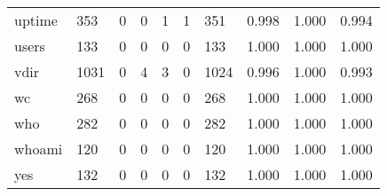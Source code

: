 \begin{longtable}{lp{1.3cm}p{1.3cm}p{1.3cm}p{1.3cm}p{1.3cm}p{1.3cm}p{1.3cm}p{1.3cm}p{1.3cm}}
uptime    &                    353 &                                  0 &                                 0 &                                1 &                                 1 &                             351 &                                   0.998 &                                  1.000 &                                0.994 \\
users     &                    133 &                                  0 &                                 0 &                                0 &                                 0 &                             133 &                                   1.000 &                                  1.000 &                                1.000 \\
vdir      &                   1031 &                                  0 &                                 4 &                                3 &                                 0 &                            1024 &                                   0.996 &                                  1.000 &                                0.993 \\
wc        &                    268 &                                  0 &                                 0 &                                0 &                                 0 &                             268 &                                   1.000 &                                  1.000 &                                1.000 \\
who       &                    282 &                                  0 &                                 0 &                                0 &                                 0 &                             282 &                                   1.000 &                                  1.000 &                                1.000 \\
whoami    &                    120 &                                  0 &                                 0 &                                0 &                                 0 &                             120 &                                   1.000 &                                  1.000 &                                1.000 \\
yes       &                    132 &                                  0 &                                 0 &                                0 &                                 0 &                             132 &                                   1.000 &                                  1.000 &                                1.000 \\
\end{longtable}
